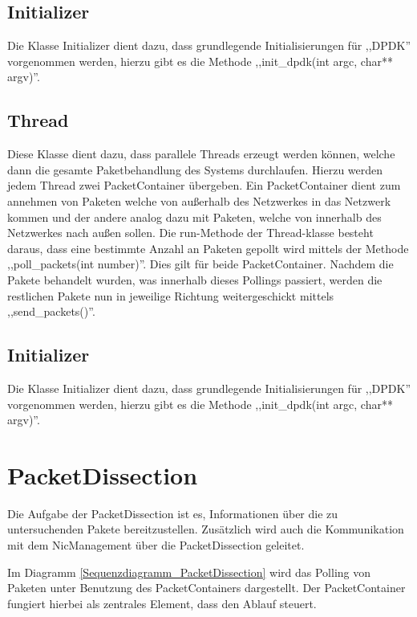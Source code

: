 \documentclass[../review_2.tex]{subfiles}
\begin{document}
\subsection{Initializer}
Die Klasse Initializer dient dazu, dass grundlegende Initialisierungen für ,,DPDK'' vorgenommen werden, hierzu gibt es die Methode ,,init\_dpdk(int argc, char** argv)''.

\subsection{Thread}
Diese Klasse dient dazu, dass parallele Threads erzeugt werden können, welche dann die gesamte Paketbehandlung des Systems durchlaufen. Hierzu werden jedem Thread zwei PacketContainer übergeben. Ein PacketContainer dient zum annehmen von Paketen welche von außerhalb des Netzwerkes in das Netzwerk kommen und der andere analog dazu mit Paketen, welche von innerhalb des Netzwerkes nach außen sollen. Die run-Methode der Thread-klasse besteht daraus, dass eine bestimmte Anzahl an Paketen gepollt wird mittels der Methode ,,poll\_packets(int number)''. Dies gilt für beide PacketContainer. Nachdem die Pakete behandelt wurden, was innerhalb dieses Pollings passiert, werden die restlichen Pakete nun in jeweilige Richtung weitergeschickt mittels ,,send\_packets()''.

\subsection{Initializer}
Die Klasse Initializer dient dazu, dass grundlegende Initialisierungen für ,,DPDK'' vorgenommen werden, hierzu gibt es die Methode ,,init\_dpdk(int argc, char** argv)''.
\section{PacketDissection}
Die Aufgabe der PacketDissection ist es, Informationen über die zu untersuchenden Pakete bereitzustellen. Zusätzlich wird auch die Kommunikation mit dem NicManagement über die PacketDissection geleitet.

Im Diagramm \ref{Sequenzdiagramm_PacketDissection} wird das Polling von Paketen unter Benutzung des PacketContainers dargestellt. Der PacketContainer fungiert hierbei als zentrales Element, dass den Ablauf steuert.
\end{document}
